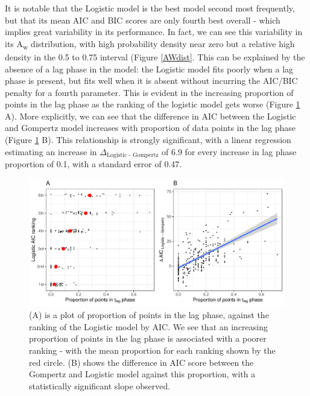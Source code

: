 \documentclass[11pt, a4paper]{article}
\begin{document}
\begin{linenumbers}
        It is notable that the Logistic model is the best model second most frequently, but that its mean AIC and BIC scores are only fourth best overall - which implies great variability in its performance. In fact, we can see this variability in its A\textsubscript{w} distribution, with high probability density near zero but a relative high density in the 0.5 to 0.75 interval (Figure \ref{AWdist}.  This can be explained by the absence of a lag phase in the model: the Logistic model fits poorly when a lag phase is present, but fits well when it is absent without incurring the AIC/BIC penalty for a fourth parameter. This is evident in the increasing proportion of points in the lag phase as the ranking of the logistic model gets worse (Figure \ref{fig:logistic_tlag} A). More explicitly, we can see that the difference in AIC between the Logistic and Gompertz model increases with proportion of data points in the lag phase (Figure \ref{fig:logistic_tlag} B). This relationship is strongly significant, with a linear regression estimating an increase in $\Delta_{\text{Logistic - Gompertz}}$ of 6.9 for every increase in lag phase proportion of 0.1, with a standard error of 0.47.
        
                \begin{figure}[H]
        \includegraphics[width=\linewidth]{../results/tlag_vs_logistic.pdf}
        \caption{(A) is a plot of proportion of points in the lag phase, against the ranking of the Logistic model by AIC. We see that an increasing proportion of points in the lag phase is associated with a poorer ranking - with the mean proportion for each ranking shown by the red circle. (B) shows the difference in AIC score between the Gompertz and Logistic model against this proportion, with a statistically significant slope observed.}
        \label{fig:logistic_tlag}
        \end{figure}        
        

\end{linenumbers}
\end{document}
